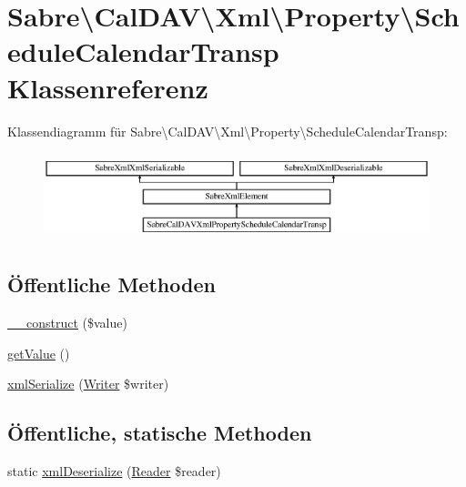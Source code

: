\hypertarget{class_sabre_1_1_cal_d_a_v_1_1_xml_1_1_property_1_1_schedule_calendar_transp}{}\section{Sabre\textbackslash{}Cal\+D\+AV\textbackslash{}Xml\textbackslash{}Property\textbackslash{}Schedule\+Calendar\+Transp Klassenreferenz}
\label{class_sabre_1_1_cal_d_a_v_1_1_xml_1_1_property_1_1_schedule_calendar_transp}
Klassendiagramm für Sabre\textbackslash{}Cal\+D\+AV\textbackslash{}Xml\textbackslash{}Property\textbackslash{}Schedule\+Calendar\+Transp\+:\begin{figure}[H]
\begin{center}
\leavevmode
\includegraphics[height=2.545455cm]{class_sabre_1_1_cal_d_a_v_1_1_xml_1_1_property_1_1_schedule_calendar_transp}
\end{center}
\end{figure}
\subsection*{Öffentliche Methoden}
\begin{DoxyCompactItemize}
\item 
\mbox{\hyperlink{class_sabre_1_1_cal_d_a_v_1_1_xml_1_1_property_1_1_schedule_calendar_transp_ab5560d0cb480354914ba35b0ed80d171}{\+\_\+\+\_\+construct}} (\$value)
\item 
\mbox{\hyperlink{class_sabre_1_1_cal_d_a_v_1_1_xml_1_1_property_1_1_schedule_calendar_transp_a217558e246e7cdb395fb32e4a54c5e9c}{get\+Value}} ()
\item 
\mbox{\hyperlink{class_sabre_1_1_cal_d_a_v_1_1_xml_1_1_property_1_1_schedule_calendar_transp_a921a17e0976f5b6050752784c5d77dc9}{xml\+Serialize}} (\mbox{\hyperlink{class_sabre_1_1_xml_1_1_writer}{Writer}} \$writer)
\end{DoxyCompactItemize}
\subsection*{Öffentliche, statische Methoden}
\begin{DoxyCompactItemize}
\item 
static \mbox{\hyperlink{class_sabre_1_1_cal_d_a_v_1_1_xml_1_1_property_1_1_schedule_calendar_transp_ab6c6613be9b32eeec0d089108fe88efd}{xml\+Deserialize}} (\mbox{\hyperlink{class_sabre_1_1_v_object_1_1_reader}{Reader}} \$reader)
\end{DoxyCompactItemize}
